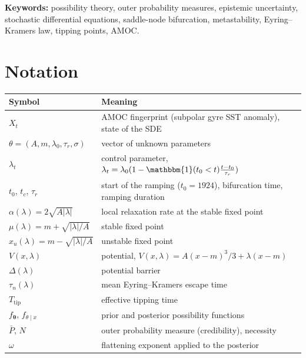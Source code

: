 \documentclass[12pt,a4paper]{article}
\theoremstyle{definition}
\theoremstyle{plain}
\newcommand{\fposs}{f_{\bm{\theta}}}
\newcommand{\Pbar}{\bar{{P}}}
\newcommand{\Ttip}{T_{\mathrm{tip}}}
\begin{document}
\vspace{0.4cm}
\noindent\textbf{Keywords:} possibility theory, outer probability measures, epistemic uncertainty, stochastic differential equations, saddle-node bifurcation, metastability, Eyring--Kramers law, tipping points, AMOC.



\newpage
\thispagestyle{plain}
{\tableofcontents}

\newpage
\thispagestyle{plain}
\section*{Notation}

\begin{center}
\renewcommand{\arraystretch}{1.25}
\begin{tabular}{ll}
\toprule
Symbol & Meaning \\
\midrule
$X_t$ & AMOC fingerprint (subpolar gyre SST anomaly), state of the SDE \\
$\theta=(A,m,\lambda_0,\tau_r,\sigma)$ & vector of unknown parameters \\
 $\lambda_t$ & control parameter, $\lambda_t = \lambda_0(1 - \mathbbm{1}(t_0 < t) \frac{t - t_0}{\tau_r})$ \\
$t_0$, $t_c$, $\tau_r$ & start of the ramping ($t_0 = 1924$), bifurcation time, ramping duration \\
$\alpha(\lambda)=2\sqrt{A|\lambda|}$ & local relaxation rate at the stable fixed point \\
$\mu(\lambda)=m+\sqrt{|\lambda|/A}$ & stable fixed point \\
$x_u(\lambda)=m-\sqrt{|\lambda|/A}$ & unstable fixed point \\
$V(x,\lambda)$ & potential, $V(x, \lambda) =A(x-m)^3/3+\lambda(x-m)$ \\
$\Delta(\lambda)$ & potential barrier \\
$\tau_n(\lambda)$ & mean Eyring--Kramers escape time \\
$\Ttip$ & effective tipping time \\
$\fposs$, $f_{\theta\mid x}$ & prior and posterior possibility functions \\
$\Pbar$, $N$ & outer probability measure (credibility), necessity \\
$\omega$ & flattening exponent applied to the posterior \\
\bottomrule
\end{tabular}
\end{center}
\end{document}
